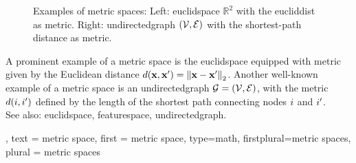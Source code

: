 {{\begin{figure}[H]
		\caption{Examples of metric spaces: Left: \gls{euclidspace} $\mathbb{R}^2$ with 
		the \gls{eucliddist} as metric. Right: \gls{undirectedgraph} $\left( \mathcal{V},\mathcal{E} \right)$ with 
		the shortest-path distance as metric.\label{fig:metric_space_examples_dict}}
	     \end{figure}
		A prominent example of a metric space 
		is the \gls{euclidspace} equipped with metric given by the Euclidean distance 
		$\metric{\featurevec}{\featurevec'} = \normgeneric{\featurevec - \featurevec'}{2}$. 
		Another well-known example of a metric space is an \gls{undirectedgraph}  
        $\mathcal{G}=\left( \mathcal{V},\mathcal{E} \right)$, with the metric $d(i,i')$ 
		defined by the length of the shortest path connecting nodes $i$ and $i'$. 
			\\
		See also: \gls{euclidspace}, \gls{featurespace}, \gls{undirectedgraph}. },
    text = {metric space}, 
	first = {metric space}, 
	type=math, 
	firstplural={metric spaces}, 
	plural = {metric spaces}
}


